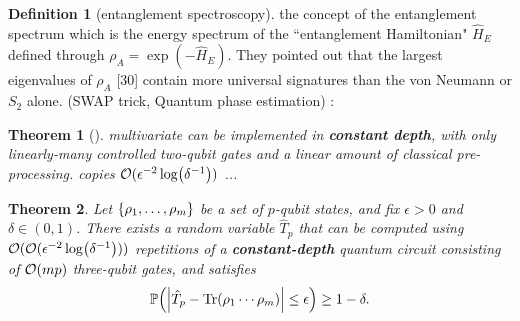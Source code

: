 \documentclass[
aps,
pra,
floatfix,
]{revtex4-2}
\theoremstyle{plain}
\newtheorem{theorem}{Theorem}
\theoremstyle{definition}
\newtheorem{definition}{Definition}
\newcommand{\hamiltonian}{\hat{H}}
\newcommand{\dm}{\rho}
\begin{document}
\begin{definition}[entanglement spectroscopy]\label{def:entanglement_spectroscopy}
	the concept of the entanglement spectrum which is the energy spectrum of the ``entanglement Hamiltonian" $\hamiltonian_E$ defined through $\dm_A = \exp(−\hamiltonian_E )$. They pointed out that the largest eigenvalues of $\dm_A$ [30] contain more universal signatures than the von Neumann  or $S_2$ alone. (SWAP trick, Quantum phase estimation)
	\cite{johriEntanglementSpectroscopyQuantum2017}:
\end{definition}

\begin{theorem}[\cite{quekMultivariateTraceEstimation2022}]\label{thm:multivariate_trace}
	multivariate  can be implemented in \textbf{constant depth}, with only linearly-many controlled two-qubit gates and a linear amount of classical pre-processing.
	copies $\mathcal{O}(\epsilon^{-2}\log( \delta^{-1}))$ ...
\end{theorem}
\begin{theorem}
	Let $\qty{\dm_1,\dots,\dm_m}$ be a set of $p$-qubit states, and fix $\epsilon > 0$ and $\delta \in (0,1)$.
	There exists a random variable $\hat{T}_p$ that can be computed using $\mathcal{O}(\mathcal{O}(\epsilon^{-2}\log( \delta^{-1})))$ repetitions of a \textbf{constant-depth} quantum circuit consisting of $\mathcal{O}(mp)$ three-qubit gates, and satisfies 
	\begin{equation}
		\probability\qty(\abs{\hat{T}_p - \Tr(\dm_1\cdots\dm_m)}\le \epsilon) \ge 1 -\delta.
	\end{equation}
\end{theorem}
\end{document}
